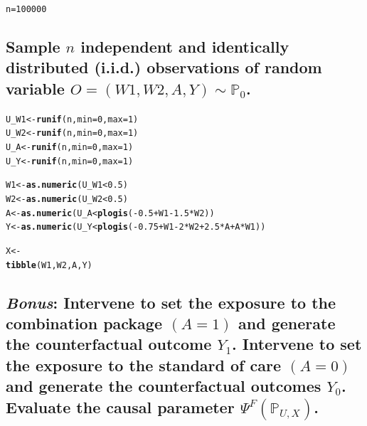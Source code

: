 \documentclass{article}\usepackage[]{graphicx}\usepackage[]{xcolor}
\makeatletter
\newcommand{\hlnum}[1]{\textcolor[rgb]{0.686,0.059,0.569}{#1}}%
\newcommand{\hlopt}[1]{\textcolor[rgb]{0,0,0}{#1}}%
\newcommand{\hlstd}[1]{\textcolor[rgb]{0.345,0.345,0.345}{#1}}%
\newcommand{\hlkwb}[1]{\textcolor[rgb]{0.69,0.353,0.396}{#1}}%
\newcommand{\hlkwc}[1]{\textcolor[rgb]{0.333,0.667,0.333}{#1}}%
\newcommand{\hlkwd}[1]{\textcolor[rgb]{0.737,0.353,0.396}{\textbf{#1}}}%
\newenvironment{kframe}{%
 \def\at@end@of@kframe{}%
 \ifinner\ifhmode%
  \def\at@end@of@kframe{\end{minipage}}%
  \begin{minipage}{\columnwidth}%
 \fi\fi%
 \def\FrameCommand##1{\hskip\@totalleftmargin \hskip-\fboxsep
 \colorbox{shadecolor}{##1}\hskip-\fboxsep
     \hskip-\linewidth \hskip-\@totalleftmargin \hskip\columnwidth}%
 \MakeFramed {\advance\hsize-\width
   \@totalleftmargin\z@ \linewidth\hsize
   \@setminipage}}%
 {\par\unskip\endMakeFramed%
 \at@end@of@kframe}
\newenvironment{knitrout}{}{} %
\makeatother
\begin{document}
\begin{knitrout}
\color{fgcolor}\begin{kframe}
\begin{alltt}
\hlstd{n} \hlkwb{=} \hlnum{100000}
\end{alltt}
\end{kframe}
\end{knitrout}
  
  \subsection{Sample $n$ independent and identically distributed (i.i.d.) observations of random variable $O=(W1,W2,A,Y) \sim \mathbb{P}_0$.}
  
\begin{knitrout}
\color{fgcolor}\begin{kframe}
\begin{alltt}
\hlstd{U_W1} \hlkwb{<-} \hlkwd{runif}\hlstd{(n,} \hlkwc{min}\hlstd{=}\hlnum{0}\hlstd{,} \hlkwc{max}\hlstd{=}\hlnum{1}\hlstd{)}
\hlstd{U_W2} \hlkwb{<-} \hlkwd{runif}\hlstd{(n,} \hlkwc{min}\hlstd{=}\hlnum{0}\hlstd{,} \hlkwc{max}\hlstd{=}\hlnum{1}\hlstd{)}
\hlstd{U_A} \hlkwb{<-} \hlkwd{runif}\hlstd{(n,} \hlkwc{min}\hlstd{=}\hlnum{0}\hlstd{,} \hlkwc{max}\hlstd{=}\hlnum{1}\hlstd{)}
\hlstd{U_Y} \hlkwb{<-} \hlkwd{runif}\hlstd{(n,} \hlkwc{min}\hlstd{=}\hlnum{0}\hlstd{,} \hlkwc{max}\hlstd{=}\hlnum{1}\hlstd{)}

\hlstd{W1} \hlkwb{<-} \hlkwd{as.numeric}\hlstd{(U_W1} \hlopt{<} \hlnum{0.5}\hlstd{)}
\hlstd{W2} \hlkwb{<-} \hlkwd{as.numeric}\hlstd{(U_W2} \hlopt{<} \hlnum{0.5}\hlstd{)}
\hlstd{A} \hlkwb{<-} \hlkwd{as.numeric}\hlstd{(U_A} \hlopt{<} \hlkwd{plogis}\hlstd{(}\hlopt{-}\hlnum{0.5}\hlopt{+}\hlstd{W1}\hlopt{-}\hlnum{1.5}\hlopt{*}\hlstd{W2))}
\hlstd{Y} \hlkwb{<-} \hlkwd{as.numeric}\hlstd{(U_Y} \hlopt{<} \hlkwd{plogis}\hlstd{(}\hlopt{-}\hlnum{0.75}\hlopt{+}\hlstd{W1}\hlopt{-}\hlnum{2}\hlopt{*}\hlstd{W2}\hlopt{+}\hlnum{2.5}\hlopt{*}\hlstd{A}\hlopt{+}\hlstd{A}\hlopt{*}\hlstd{W1))}

\hlstd{X} \hlkwb{<-}
  \hlkwd{tibble}\hlstd{(W1, W2, A, Y)}
\end{alltt}
\end{kframe}
\end{knitrout}
  
  
  \subsection{\textit{Bonus}: Intervene to set the exposure to the combination package $(A=1)$ and generate the counterfactual outcome $Y_1$. Intervene to set the exposure to the standard of care $(A=0)$ and generate the counterfactual outcomes $Y_0$. Evaluate the causal parameter $\Psi^F(\mathbb{P}_{U,X})$.}
  
\end{document}
